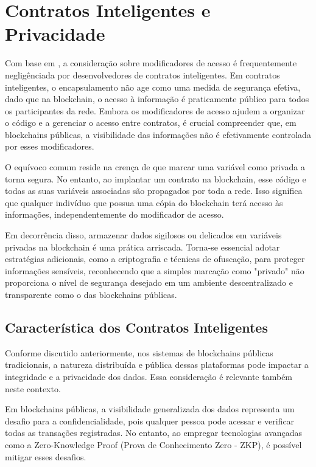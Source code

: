 
\chapter{\label{chap:chap2}Contratos Inteligentes e Privacidade}

Com base em  \cite{GGA}, a consideração sobre modificadores de acesso é frequentemente negligênciada por desenvolvedores de contratos inteligentes. Em contratos inteligentes, o encapsulamento não age como uma medida de segurança efetiva, dado que na blockchain, o acesso à informação é praticamente público para todos os participantes da rede. Embora os modificadores de acesso ajudem a organizar o código e a gerenciar o acesso entre contratos, é crucial compreender que, em blockchains públicas, a visibilidade das informações não é efetivamente controlada por esses modificadores.

O equívoco comum reside na crença de que marcar uma variável como privada a torna segura. No entanto, ao implantar um contrato na blockchain, esse código e todas as suas variáveis associadas são propagados por toda a rede. Isso significa que qualquer indivíduo que possua uma cópia do blockchain terá acesso às informações, independentemente do modificador de acesso.

Em decorrência disso, armazenar dados sigilosos ou delicados em variáveis privadas na blockchain é uma prática arriscada. Torna-se essencial adotar estratégias adicionais, como a criptografia e técnicas de ofuscação, para proteger informações sensíveis, reconhecendo que a simples marcação como "privado" não proporciona o nível de segurança desejado em um ambiente descentralizado e transparente como o das blockchains públicas.


\section{Característica dos Contratos Inteligentes}

Conforme discutido anteriormente, nos sistemas de blockchains públicas tradicionais, a natureza distribuída e pública dessas plataformas pode impactar a integridade e a privacidade dos dados. Essa consideração é relevante também neste contexto.

Em blockchains públicas, a visibilidade generalizada dos dados representa um desafio para a confidencialidade, pois qualquer pessoa pode acessar e verificar todas as transações registradas. No entanto, ao empregar tecnologias avançadas como a Zero-Knowledge Proof (Prova de Conhecimento Zero - ZKP), é possível mitigar esses desafios.

